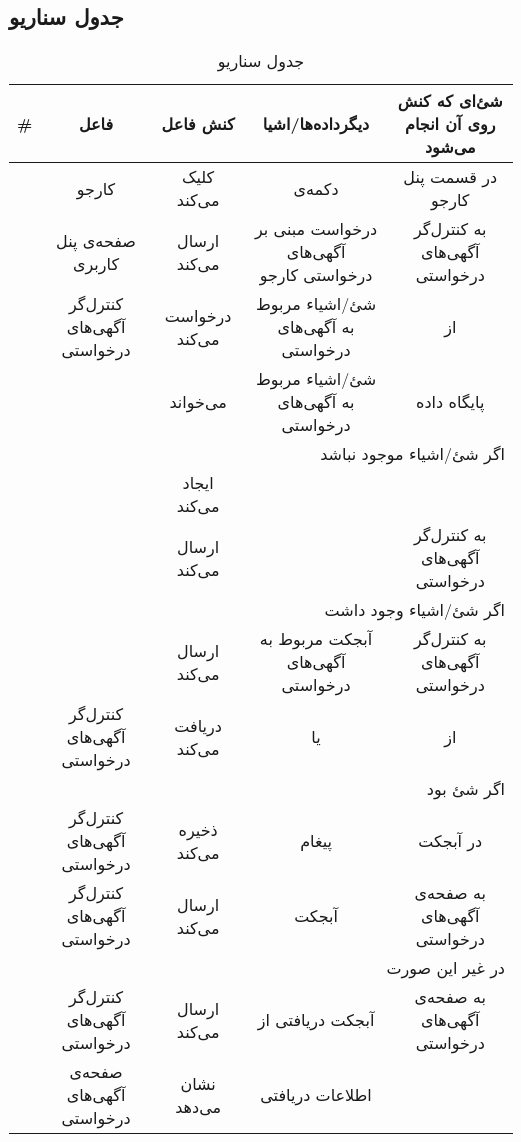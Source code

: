 \subsection{جدول سناریو}
\begin{table}[H]
	\caption{جدول سناریو }
	\begin{adjustbox}{width=\textwidth}
		\begin{tabular}{|c|c|c|c|c|}
			\hline					
			\# & فاعل & کنش فاعل & دیگرداده‌ها/اشیا & شئ‌ای که کنش روی آن انجام می‌شود \\
			\hline
			\hline
			\sstep &
			کارجو &
			کلیک می‌کند &
			دکمه‌ی \say{وضعیت آگهی‌های درخواستی}&
			در قسمت پنل کارجو \\
			\hline
			\sstep &
			صفحه‌ی پنل کاربری &
			ارسال می‌کند &
			درخواست مبنی بر آگهی‌های درخواستی کارجو &
			به کنترل‌گر آگهی‌های درخواستی \\
			\hline
			\sstep &
			کنترل‌گر آگهی‌های درخواستی &
			درخواست می‌کند &
			شئ/اشیاء مربوط به آگهی‌های درخواستی &
			از \gdm\\
			\hline
			\sstep &
			\gdm &
			می‌خواند &
			شئ/اشیاء مربوط به آگهی‌های درخواستی &
			پایگاه داده \\
			\hline
			\sstep &
			\multicolumn{4}{|r|}{اگر شئ/اشیاء موجود نباشد}\\
			\hline
			\sstep &
			\gdm &
			ایجاد می‌کند &
			\none &
			\\
			\hline
			\sstep &
			\gdm &
			ارسال می‌کند &
			\none &
			به کنترل‌گر آگهی‌های درخواستی \\
			\hline
			\sstep &
			\multicolumn{4}{|r|}{اگر شئ/اشیاء وجود داشت} \\
			\hline
			\sstep &
			\gdm &
			ارسال می‌کند &
			آبجکت \json مربوط به آگهی‌های درخواستی &
			به کنترل‌گر آگهی‌های درخواستی\\
			\hline
			\sstep &
			کنترل‌گر آگهی‌های درخواستی &
			دریافت می‌کند &
			\none یا \json &
			از \gdm \\
			\hline
			\sstep &
			\multicolumn{4}{|r|}{اگر شئ \none بود}\\
			\hline
			\sstep &
			کنترل‌گر آگهی‌های درخواستی &
			ذخیره می‌کند &
			پیغام \say{درخواستی موجود نمی‌باشد.}&
			در آبجکت \json \\
			\hline
			\sstep &
			کنترل‌گر آگهی‌های درخواستی&
			ارسال می‌کند &
			آبجکت \json&
			به صفحه‌ی آگهی‌های درخواستی \\
			\hline
			\sstep &
			\multicolumn{4}{|r|}{در غیر این صورت}
			\\
			\hline
			\sstep &
			کنترل‌گر آگهی‌های درخواستی &
		    ارسال می‌کند&
			آبجکت \json دریافتی از \gdm &
			به صفحه‌ی آگهی‌های درخواستی \\
			\hline
			\sstep &
			صفحه‌ی آگهی‌های درخواستی &
			نشان می‌دهد &
			اطلاعات دریافتی &
			\\
			\hline
		\end{tabular}
	\end{adjustbox}
\end{table}
\setcounter{MainStepCounter}{0}
\setcounter{SenarioCounter}{0}
